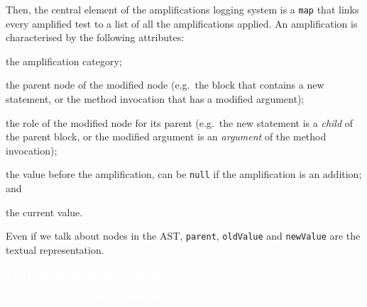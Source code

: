 \documentclass[a4paper,11pt]{sdm_internship}
\newcommand{\todo}[1]{\colorbox{Red!75}{\textcolor{white}{\textbf{TODO\ifx&#1&\else: #1\fi}}}}
\theoremstyle{definition}
\begin{document}
Then, the central element of the amplifications logging system is a \texttt{map} that links every amplified test to a list of all the amplifications applied.
An amplification is characterised by the following attributes:
\begin{description}[itemindent=0em,labelwidth=7em,leftmargin=7em,align=right]
  \item[\texttt{ampCategory}] the amplification category;
  \item[\texttt{parent}] the parent node of the modified node (e.g.\ the block that contains a new statement, or the method invocation that has a modified argument);
  \item[\texttt{role}] the role of the modified node for its parent (e.g.\ the new statement is a \textit{child} of the parent block, or the modified argument is an \textit{argument} of the method invocation);
  \item[\texttt{oldValue}] the value before the amplification, can be \texttt{null} if the amplification is an addition; and
  \item[\texttt{newValue}] the current value.
\end{description}
Even if we talk about nodes in the AST, \texttt{parent}, \texttt{oldValue} and \texttt{newValue} are the textual representation.

\todo{minimisation}

\todo{alternatives}





\end{document}
